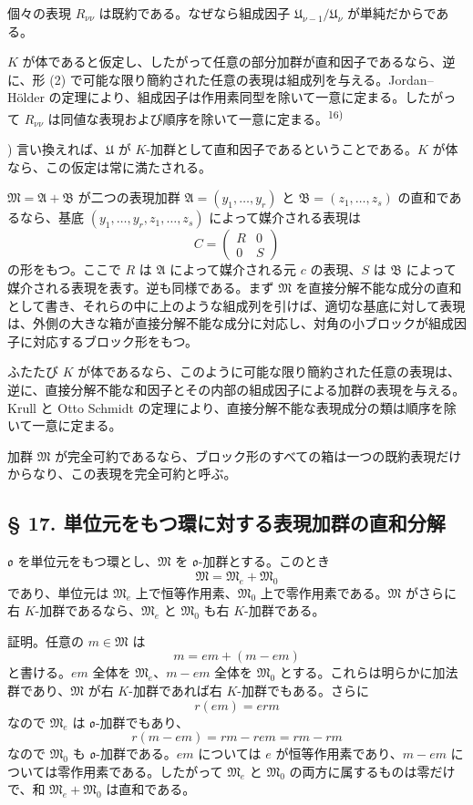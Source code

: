 \documentclass[11pt]{article}
\providecommand{\mA}{\mathfrak{A}}
\providecommand{\mB}{\mathfrak{B}}
\providecommand{\mM}{\mathfrak{M}}
\providecommand{\mU}{\mathfrak{U}}
\providecommand{\mo}{\mathfrak{o}}
\begin{document}
個々の表現 $R_{\nu\nu}$ は既約である。なぜなら組成因子 $\mU_{\nu-1}/\mU_\nu$ が単純だからである。

$K$ が体であると仮定し、したがって任意の部分加群が直和因子であるなら、逆に、形 (2) で可能な限り簡約された任意の表現は組成列を与える。Jordan--Hölder の定理により、組成因子は作用素同型を除いて一意に定まる。したがって $R_{\nu\nu}$ は同値な表現および順序を除いて一意に定まる。\textsuperscript{16)}

{\footnotesize{}) 言い換えれば、$\mU$ が $K$-加群として直和因子であるということである。$K$ が体なら、この仮定は常に満たされる。\par}

$\mM=\mA+\mB$ が二つの表現加群 $\mA=(y_1,\ldots,y_r)$ と $\mB=(z_1,\ldots,z_s)$ の直和であるなら、基底 $(y_1,\ldots,y_r,z_1,\ldots,z_s)$ によって媒介される表現は
\[
        C=\begin{pmatrix}R&0\\0&S\end{pmatrix}
\]
の形をもつ。ここで $R$ は $\mA$ によって媒介される元 $c$ の表現、$S$ は $\mB$ によって媒介される表現を表す。逆も同様である。まず $\mM$ を直接分解不能な成分の直和として書き、それらの中に上のような組成列を引けば、適切な基底に対して表現は、外側の大きな箱が直接分解不能な成分に対応し、対角の小ブロックが組成因子に対応するブロック形をもつ。

ふたたび $K$ が体であるなら、このように可能な限り簡約された任意の表現は、逆に、直接分解不能な和因子とその内部の組成因子による加群の表現を与える。Krull と Otto Schmidt の定理により、直接分解不能な表現成分の類は順序を除いて一意に定まる。

加群 $\mM$ が完全可約であるなら、ブロック形のすべての箱は一つの既約表現だけからなり、この表現を完全可約と呼ぶ。

\subsection*{§ 17. 単位元をもつ環に対する表現加群の直和分解}

$\mo$ を単位元をもつ環とし、$\mM$ を $\mo$-加群とする。このとき
\[
        \mM=\mM_e+\mM_0
\]
であり、単位元は $\mM_e$ 上で恒等作用素、$\mM_0$ 上で零作用素である。$\mM$ がさらに右 $K$-加群であるなら、$\mM_e$ と $\mM_0$ も右 $K$-加群である。

証明。任意の $m\in\mM$ は
\[
        m=em+(m-em)
\]
と書ける。$em$ 全体を $\mM_e$、$m-em$ 全体を $\mM_0$ とする。これらは明らかに加法群であり、$\mM$ が右 $K$-加群であれば右 $K$-加群でもある。さらに
\[
        r(em)=erm
\]
なので $\mM_e$ は $\mo$-加群でもあり、
\[
        r(m-em)=rm-rem=rm-rm
\]
なので $\mM_0$ も $\mo$-加群である。$em$ については $e$ が恒等作用素であり、$m-em$ については零作用素である。したがって $\mM_e$ と $\mM_0$ の両方に属するものは零だけで、和 $\mM_e+\mM_0$ は直和である。
\end{document}
